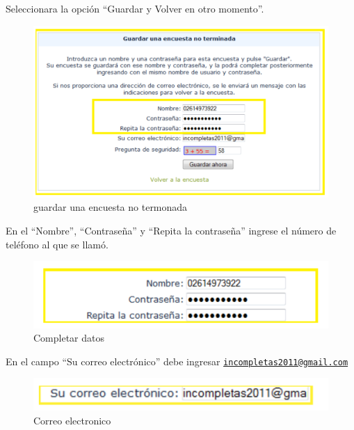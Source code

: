 \documentclass[
  openany]{book}
\begin{document}
Seleccionara la opción ``Guardar y Volver en otro momento''.

\begin{figure}

{\centering \includegraphics[width=1\linewidth]{imagenes/figura6-33} 

}

\caption{guardar una encuesta no termonada}\label{fig:ennoter4}
\end{figure}

En el ``Nombre'', ``Contraseña'' y ``Repita la contraseña'' ingrese el número de teléfono al que se llamó.

\begin{figure}

{\centering \includegraphics[width=1\linewidth]{imagenes/figura6-34} 

}

\caption{Completar datos}\label{fig:ennotermi6}
\end{figure}

En el campo ``Su correo electrónico'' debe ingresar \href{mailto:incompletas2011@gmail.com}{\nolinkurl{incompletas2011@gmail.com}}

\begin{figure}

{\centering \includegraphics[width=1\linewidth]{imagenes/figura6-35} 

}

\caption{Correo electronico}\label{fig:ennotermina9}
\end{figure}
\end{document}
